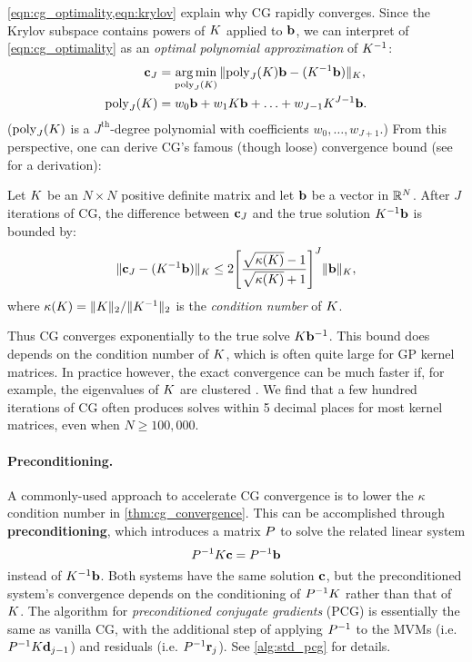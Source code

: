\cref{eqn:cg_optimality,eqn:krylov} explain why CG rapidly converges.
Since the Krylov subspace contains powers of $K$ applied to $\mathbf{b}$, we can interpret of \cref{eqn:cg_optimality} as an \emph{optimal polynomial approximation} of $K^{-1}$:
%
\begin{align*}
  \mathbf{c}_J &= \operatorname*{arg\,min}_{\text{poly}_J(K)} \Vert \text{poly}_J(K)\mathbf{b} - (K^{-1} \mathbf{b}) \Vert_{K},
  \\
  \text{poly}_J(K) &= w_0 \mathbf{b} + w_1 K \mathbf{b} + \ldots + w_{J-1} K^{J-1} \mathbf{b}.
\end{align*}
%
($\text{poly}_J(K)$ is a $J^\text{th}$-degree polynomial with coefficients $w_0, \ldots, w_{J+1}$.)
From this perspective, one can derive CG's famous (though loose) convergence bound (see \citep{shewchuk1994introduction} for a derivation):
%
\begin{theorem}[Convergence of CG]
  \label{thm:cg_convergence}
  Let $K$ be an $N \times N$ positive definite matrix and let $\mathbf{b}$ be a vector in $\mathbb{R}^N$.
  After $J$ iterations of CG, the difference between $\mathbf{c}_J$ and the true solution $K^{-1} \mathbf{b}$ is bounded by:
  \begin{equation*}
    \Vert \mathbf{c}_J - (K^{-1} \mathbf{b}) \Vert_{K}
    \leq
    2 \Bigg[ \frac{ \sqrt{ \kappa(K) } - 1 }{\sqrt{ \kappa(K) } + 1} \Biggr]^J \Vert \mathbf{b} \Vert_{K},
  \end{equation*}
  where $\kappa(K) = \Vert K \Vert_2 / \Vert K^{-1} \Vert_2$ is the \emph{condition number} of $K$.
\end{theorem}
%
Thus CG converges exponentially to the true solve $K \mathbf{b}^{-1}$.
This bound does depends on the condition number of $K$, which is often quite large for GP kernel matrices.
In practice however, the exact convergence can be much faster if, for example, the eigenvalues of $K$ are clustered \cite{saad2003iterative}.
We find that a few hundred iterations of CG often produces solves within 5 decimal places for most kernel matrices, even when $N \geq 100,\!000$.

\paragraph{Preconditioning.}
A commonly-used approach to accelerate CG convergence is to lower the $\kappa$ condition number in \cref{thm:cg_convergence}.
This can be accomplished through {\bf preconditioning}, which introduces a matrix $P$ to solve the related linear system
%
\[
  P^{-1} K \mathbf{c} = P^{-1} \mathbf{b}
\]
%
instead of $K^{-1} \mathbf{b}$.
Both systems have the same solution $\mathbf{c}$, but the preconditioned system's convergence depends on the conditioning of $P^{-1} K$ rather than that of $K$.
The algorithm for \emph{preconditioned conjugate gradients} (PCG) is essentially the same as vanilla CG, with the additional step of applying $P^{-1}$ to the MVMs (i.e. $P^{-1} K \mathbf{d}_{j-1}$) and residuals (i.e. $P^{-1} \mathbf{r}_j$).
See \cref{alg:std_pcg} for details.

